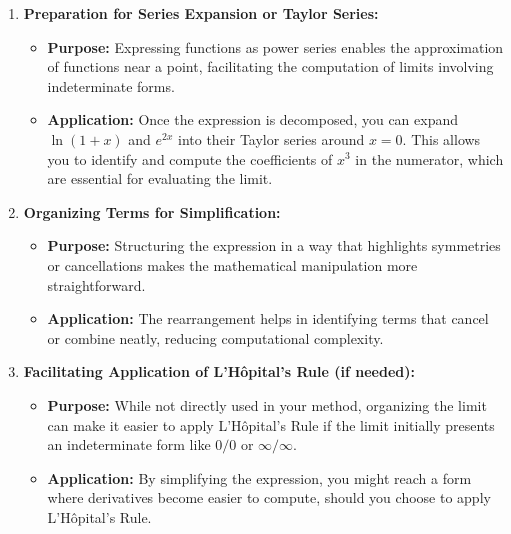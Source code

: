 \documentclass[a4paper,12pt]{book}
\begin{document}
\begin{enumerate}
\item 
\textbf{Preparation for Series Expansion or Taylor Series:}
\begin{itemize}
\item 
\textbf{Purpose:} Expressing functions as power series enables the approximation of functions near a point, facilitating the computation of limits involving indeterminate forms.

\item 
\textbf{Application:} Once the expression is decomposed, you can expand \( \ln(1+x) \) and \( e^{2x} \) into their Taylor series around \( x = 0 \). This allows you to identify and compute the coefficients of \( x^3 \) in the numerator, which are essential for evaluating the limit.

\end{itemize}

\item 
\textbf{Organizing Terms for Simplification:}
\begin{itemize}
\item 
\textbf{Purpose:} Structuring the expression in a way that highlights symmetries or cancellations makes the mathematical manipulation more straightforward.

\item 
\textbf{Application:} The rearrangement helps in identifying terms that cancel or combine neatly, reducing computational complexity.

\end{itemize}

\item 
\textbf{Facilitating Application of L’Hôpital’s Rule (if needed):}
\begin{itemize}
\item 
\textbf{Purpose:} While not directly used in your method, organizing the limit can make it easier to apply L’Hôpital’s Rule if the limit initially presents an indeterminate form like \( 0/0 \) or \( \infty/\infty \).

\item 
\textbf{Application:} By simplifying the expression, you might reach a form where derivatives become easier to compute, should you choose to apply L’Hôpital’s Rule.

\end{itemize}

\end{enumerate}
\end{document}
